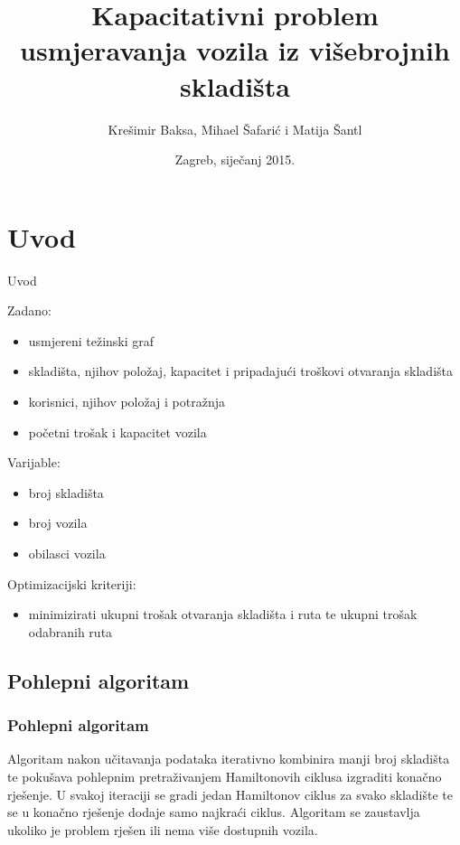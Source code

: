 \documentclass[utf8]{beamer}
\title[Projekt]{Kapacitativni problem usmjeravanja vozila iz višebrojnih skladišta}
\author{Krešimir Baksa, Mihael Šafarić i Matija Šantl}
\institute{Heurističke metode optimizacije\\*Fakultet elektrotehnike i računarstva}
\date{Zagreb, siječanj 2015.}
\begin{document}
\begin{frame}
\titlepage
\end{frame}


\section{Uvod}
\begin{frame}{Uvod}

Zadano:
\begin{itemize}
  \item usmjereni težinski graf
  \item skladišta, njihov položaj, kapacitet i pripadajući troškovi otvaranja skladišta 
  \item korisnici, njihov položaj i potražnja
  \item početni trošak i kapacitet vozila
\end{itemize}

Varijable:
\begin{itemize}
  \item broj skladišta 
  \item broj vozila
  \item obilasci vozila
\end{itemize}

Optimizacijski kriteriji:
\begin{itemize}
  \item minimizirati ukupni trošak otvaranja skladišta i ruta te ukupni trošak odabranih ruta
\end{itemize}

\end{frame}

\subsection{Pohlepni algoritam}
\begin{frame}
\frametitle{Pohlepni algoritam}

Algoritam nakon učitavanja podataka iterativno kombinira manji broj skladišta te pokušava pohlepnim pretraživanjem Hamiltonovih ciklusa izgraditi konačno rješenje. U svakoj iteraciji se gradi jedan Hamiltonov ciklus za svako skladište te se u konačno rješenje dodaje samo najkraći ciklus. Algoritam se zaustavlja ukoliko je problem rješen ili nema više dostupnih vozila.

\end{frame}
\end{document}
